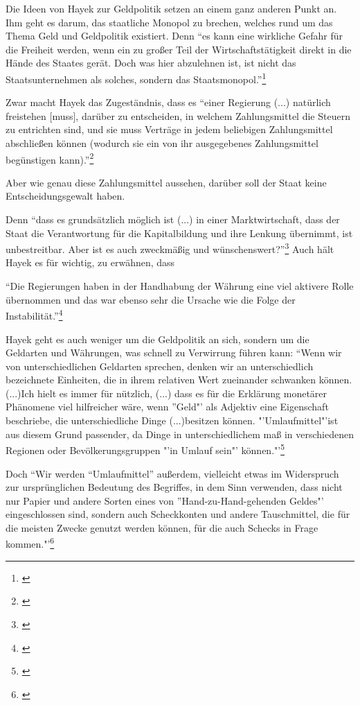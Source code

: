\documentclass[
        onecolumn,
        a4paper,
        abstracton,
        parskip=half
        ,final
        ]{scrartcl}
\begin{document}
Die Ideen von Hayek zur Geldpolitik setzen an einem ganz anderen Punkt an. Ihm geht es darum, das staatliche Monopol zu brechen, welches rund um das Thema Geld und Geldpolitik existiert. Denn
"`es kann eine wirkliche Gefahr f{\"u}r die Freiheit werden, wenn ein zu großer Teil der Wirtschaftst{\"a}tigkeit direkt in die H{\"a}nde des Staates ger{\"a}t. Doch was hier abzulehnen ist, ist nicht das Staatsunternehmen als solches, sondern das Staatsmonopol."'\footnote[411]{\citep*[S.290]{hayek1971}}

Zwar macht Hayek das Zugest{\"a}ndnis, dass es "`einer Regierung (...) nat{\"u}rlich freistehen [muss], dar{\"u}ber zu entscheiden, in welchem Zahlungsmittel die Steuern zu entrichten sind, und sie muss Vertr{\"a}ge in jedem beliebigen Zahlungsmittel abschließen k{\"o}nnen (wodurch sie ein von ihr ausgegebenes Zahlungsmittel beg{\"u}nstigen kann)."'\footnote[412]{\citep*[S.23]{Hayek1977}}

Aber wie genau diese Zahlungsmittel aussehen, dar{\"u}ber soll der Staat keine Entscheidungsgewalt haben.

Denn "`dass es grunds{\"a}tzlich m{\"o}glich ist (...) in einer Marktwirtschaft, dass der Staat die Verantwortung f{\"u}r die Kapitalbildung und ihre Lenkung {\"u}bernimmt, ist unbestreitbar. Aber ist es auch zweckm{\"a}ßig und w{\"u}nschenswert?"'\footnote[413]{\citep*[S.22]{Hayek1969}}
Auch h{\"a}lt Hayek es f{\"u}r wichtig, zu erw{\"a}hnen, dass

"`Die Regierungen haben in der Handhabung der W{\"a}hrung eine viel aktivere Rolle {\"u}bernommen und das war ebenso sehr die Ursache wie die Folge der Instabilit{\"a}t."'\footnote[415]{ \citep*[S.409]{hayek1971}}

Hayek geht es auch weniger um die Geldpolitik an sich, sondern um die Geldarten und W{\"a}hrungen, was schnell zu Verwirrung f{\"u}hren kann: "`Wenn wir von unterschiedlichen Geldarten sprechen, denken wir an unterschiedlich bezeichnete Einheiten, die in ihrem relativen Wert zueinander schwanken k{\"o}nnen. (...)Ich hielt es immer f{\"u}r n{\"u}tzlich, (...) dass es f{\"u}r die Erkl{\"a}rung monet{\"a}rer Ph{\"a}nomene viel hilfreicher w{\"a}re, wenn "'Geld"' als Adjektiv eine Eigenschaft beschriebe, die unterschiedliche Dinge (...)besitzen k{\"o}nnen. "'Umlaufmittel"'ist aus diesem Grund passender, da Dinge in unterschiedlichem maß in verschiedenen Regionen oder Bev{\"o}lkerungsgruppen "'in Umlauf sein"' k{\"o}nnen."'\footnote[416]{\citep*[S.40f]{Hayek1977}}

Doch
"`Wir werden "`Umlaufmittel"' außerdem, vielleicht etwas im Widerspruch zur urspr{\"u}nglichen Bedeutung des Begriffes, in dem Sinn verwenden, dass nicht nur Papier und andere Sorten eines von "'Hand-zu-Hand-gehenden Geldes"' eingeschlossen sind, sondern auch Scheckkonten und andere Tauschmittel, die f{\"u}r die meisten Zwecke genutzt werden k{\"o}nnen, f{\"u}r die auch Schecks in Frage kommen."'\footnote[417]{\citep*[S.43]{Hayek1977}}
\end{document}
